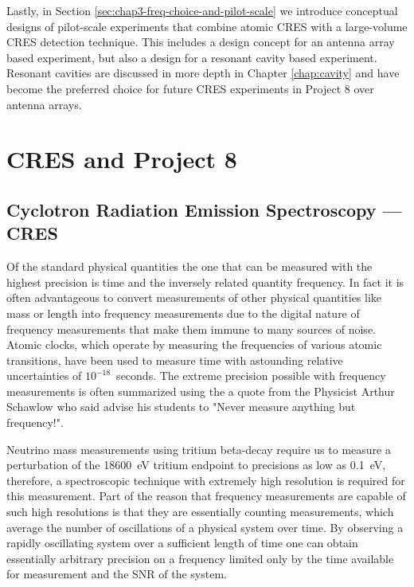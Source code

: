 Lastly, in Section \ref{sec:chap3-freq-choice-and-pilot-scale} we introduce conceptual designs of pilot-scale experiments that combine atomic CRES with a large-volume CRES detection technique. This includes a design concept for an antenna array based experiment, but also a design for a resonant cavity based experiment. Resonant cavities are discussed in more depth in Chapter \ref{chap:cavity} and have become the preferred choice for future CRES experiments in Project 8 over antenna arrays.

\section{CRES and Project 8}
\label{sec:chap3-cres-and-p8}

\subsection{Cyclotron Radiation Emission Spectroscopy --- CRES}

Of the standard physical quantities the one that can be measured with the highest precision is time and the inversely related quantity frequency. In fact it is often advantageous to convert measurements of other physical quantities like mass or length into frequency measurements due to the digital nature of frequency measurements that make them immune to many sources of noise. Atomic clocks, which operate by measuring the frequencies of various atomic transitions, have been used to measure time with astounding relative uncertainties of $10^{-18}$~seconds. The extreme precision possible with frequency measurements is often summarized using the a quote from the Physicist Arthur Schawlow who said advise his students to "Never measure anything but frequency!". 

Neutrino mass measurements using tritium beta-decay require us to measure a perturbation of the 18600~eV tritium endpoint to precisions as low as 0.1~eV, therefore, a spectroscopic technique with extremely high resolution is required for this measurement. Part of the reason that frequency measurements are capable of such high resolutions is that they are essentially counting measurements, which average the number of oscillations of a physical system over time. By observing a rapidly oscillating system over a sufficient length of time one can obtain essentially arbitrary precision on a frequency limited only by the time available for measurement and the SNR of the system.

